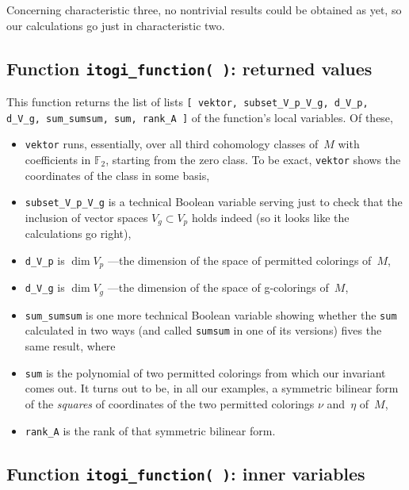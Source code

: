 \documentclass[12pt]{article}
\theoremstyle{definition}
\theoremstyle{remark}
\begin{document}
Concerning characteristic three, no nontrivial results could be obtained as yet, so our calculations go just in characteristic two.

\subsection{Function \texttt{itogi\_function( )}: returned values}

This function returns the list of lists \texttt{[ vektor, subset\_V\_p\_V\_g, d\_V\_p, d\_V\_g, sum\_sumsum, sum, rank\_A ]} of the function's local variables. Of these,
\begin{itemize}
 \item \texttt{vektor} runs, essentially, over all third cohomology classes of~$M$ with coefficients in $\mathbb F_2$, starting from the zero class. To be exact, \texttt{vektor} shows the coordinates of the class in some basis,
 \item \texttt{subset\_V\_p\_V\_g} is a technical Boolean variable serving just to check that the inclusion of vector spaces $V_g \subset V_p$ holds indeed (so it looks like the calculations go right),
 \item \texttt{d\_V\_p} is $\dim V_p$ ---the dimension of the space of permitted colorings of~$M$,
 \item \texttt{d\_V\_g} is $\dim V_g$ ---the dimension of the space of g-colorings of~$M$,
 \item \texttt{sum\_sumsum} is one more technical Boolean variable showing whether the \texttt{sum} calculated in two ways (and called \texttt{sumsum} in one of its versions) fives the same result, where
 \item \texttt{sum} is the polynomial of two permitted colorings from which our invariant comes out. It turns out to be, in all our examples, a symmetric bilinear form of the \emph{squares} of coordinates of the two permitted colorings $\nu$ and~$\eta$ of~$M$,
 \item \texttt{rank\_A} is the rank of that symmetric bilinear form.
\end{itemize}

\subsection{Function \texttt{itogi\_function( )}: inner variables}
\end{document}
